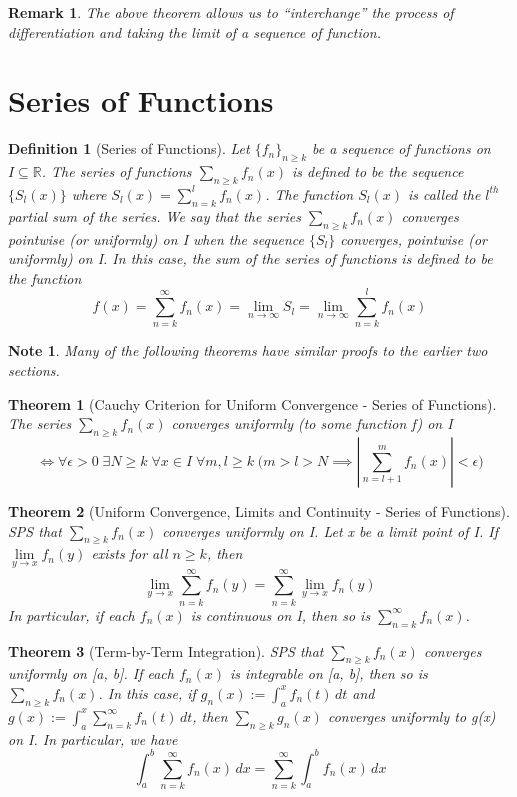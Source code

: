 \documentclass[11pt, oneside]{book}
\theoremstyle{break}
\newtheorem{thm}{Theorem}[section]
\newtheorem*{remark}{Remark}
\newtheorem*{note}{Note}
\newtheorem{defn}{Definition}[section]
\newcommand{\bb}[1]{\mathbb{#1}}			%
\begin{document}
\begin{remark}
	The above theorem allows us to ``interchange'' the process of differentiation and taking the limit of a sequence of function.
\end{remark}


\section{Series of Functions}
\begin{defn}[Series of Functions]
	Let $\{f_n\}_{n \geq k}$ be a sequence of functions on $I \subseteq \bb{R}$. The series of functions $\sum\limits_{n \geq k} f_n(x)$ is defined to be the sequence $\{S_l(x)\}$ where $S_l(x) = \sum\limits_{n = k}^{l} f_n(x)$. The function $S_l(x)$ is called the $l^{th}$ partial sum of the series. We say that the series $\sum\limits_{n \geq k} f_n(x)$ converges pointwise (or uniformly) on I when the sequence $\{S_l\}$ converges, pointwise (or uniformly) on I. In this case, the sum of the series of functions is defined to be the function
	\[
		f(x) = \sum_{n = k}^{\infty} f_n(x) = \lim_{n \to \infty} S_l = \lim_{n \to \infty} \sum_{n = k}^{l} f_n(x)
	\]
\end{defn}

\begin{note}
	Many of the following theorems have similar proofs to the earlier two sections.
\end{note}

\begin{thm}[Cauchy Criterion for Uniform Convergence - Series of Functions]
	The series $\sum_{n \geq k} f_n(x)$ converges uniformly (to some function f) on I
	\[
		\iff \forall \epsilon > 0 \; \exists N \geq k \; \forall x \in I \; \forall m, l \geq k \; \Bigg(m > l > N \implies \left|\sum_{n = l + 1}^{m} f_n(x) \right| < \epsilon \Bigg)
	\]
\end{thm}

\begin{thm}[Uniform Convergence, Limits and Continuity - Series of Functions]\label{unif_conv_series_fn}
	SPS that $\sum_{n \geq k} f_n(x)$ converges uniformly on I. Let x be a limit point of I. If $\lim\limits_{y \to x} f_n(y)$ exists for all $n \geq k$, then
	\[
		\lim_{y \to x} \sum_{n = k}^{\infty} f_n(y) = \sum_{n = k}^{\infty} \lim_{y \to x} f_n(y)
	\]
	In particular, if each $f_n(x)$ is continuous on I, then so is $\sum_{n = k}^{\infty} f_n(x)$.
\end{thm}

\begin{thm}[Term-by-Term Integration]
	SPS that $\sum_{n \geq k} f_n(x)$ converges uniformly on [a, b]. If each $f_n(x)$ is integrable on [a, b], then so is $\sum_{n \geq k} f_n(x)$. In this case, if $g_n(x) := \int_{a}^{x} f_n(t) \, dt$ and $g(x) := \int_{a}^{x} \sum_{n = k}^{\infty} f_n(t) \, dt$, then $\sum_{n \geq k} g_n(x)$ converges uniformly to g(x) on I. In particular, we have
	\[
		\int_{a}^{b} \sum_{n = k}^{\infty} f_n(x) \, dx = \sum_{n = k}^{\infty} \int_{a}^{b} f_n(x) \, dx
	\]
\end{thm}
\end{document}
